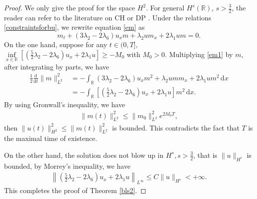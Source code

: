 \documentclass[11pt]{article}
\begin{document}
\begin{proof}
We only give the proof for the space $H^2$. For general $ H^s(\mathbb{R})$, $s>\tfrac{3}{2}$, the reader can refer to the literature on CH \cite{constantin1998well} or DP \cite{liu2006global}. Under the relations \eqref{constraintsforbu}, we rewrite equation \eqref{em} as
\begin{equation}\label{em1}
m_t+(3\lambda_2-2\lambda_6)u_xm+\lambda_2um_x+2\lambda_1um=0.
\end{equation}
On the one hand, suppose for any $t\in (0, T]$,  $\inf\limits_{x\in\mathbb{R}}\left[\left(\frac{5}{2}\lambda_2-2\lambda_6\right)u_x+2\lambda_1u\right]\geq -M_0$ with $M_0>0$.
Multiplying \eqref{em1} by $m$, after integrating by parts, we have
\begin{equation*}
\begin{aligned}
\frac{1}{2}\frac{\mathrm{d}}{\mathrm{d}t}\|m\|_{L^2}^2&=-\int_{\mathbb{R}}(3\lambda_2-2\lambda_6)u_xm^2+\lambda_2umm_x+2\lambda_1um^2\,\mathrm{d}x\\
&=-\int_{\mathbb{R}}\left[\left(\frac{5}{2}\lambda_2-2\lambda_6\right)u_x+2\lambda_1u\right]m^2\,\mathrm{d}x.
\end{aligned}
\end{equation*}
By using Gronwall's inequality, we have
\begin{eqnarray*}
\|m(t)\|_{L^2}^2\leq\|m_0\|_{L^2}^2e^{2M_0T},
\end{eqnarray*}
then $\|u(t)\|_{H^2}^2\leq\|m(t)\|_{L^2}^2$ is bounded. This contradicts the fact that $T$ is the maximal time of existence.

On the other hand, the solution does not blow up in $H^s, s>\tfrac{3}{2}$, that is $\|u\|_{H^s}$ is bounded, by Morrey's inequality, we have
\begin{eqnarray*}
\left\|\left(\frac{5}{2}\lambda_2-2\lambda_6\right)u_x+2\lambda_1u\right\|_{L^\infty}\leq C\|u\|_{H^s}<+\infty.
\end{eqnarray*}
This completes the proof of Theorem \ref{bls2}.
\end{proof}
\end{document}
